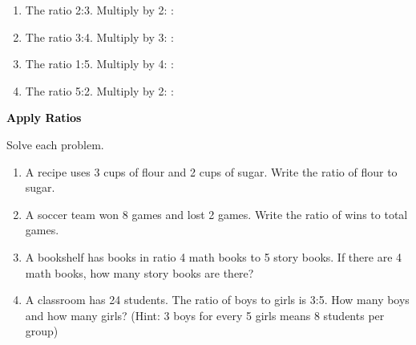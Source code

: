 \documentclass[12pt, letterpaper, fleqn]{article}
\newcommand{\blank}{\underline{\hspace{2.2cm}}}
\begin{document}
\begin{enumerate}[itemsep=1.5cm, leftmargin=0.6cm]

\item The ratio 2:3. Multiply by 2: \blank : \blank

\item The ratio 3:4. Multiply by 3: \blank : \blank

\item The ratio 1:5. Multiply by 4: \blank : \blank

\item The ratio 5:2. Multiply by 2: \blank : \blank

\end{enumerate}

\newpage

\begin{tcolorbox}[colback=customteal!20]
\large\textcolor{black}{\textbf{Apply Ratios}}
\end{tcolorbox}

\noindent
Solve each problem.

\vspace{3mm}

\begin{enumerate}[itemsep=1.8cm, leftmargin=0.6cm]

\item A recipe uses 3 cups of flour and 2 cups of sugar. Write the ratio of flour to sugar.

\vspace{1.2cm}

\item A soccer team won 8 games and lost 2 games. Write the ratio of wins to total games.

\vspace{1.2cm}

\item A bookshelf has books in ratio 4 math books to 5 story books. If there are 4 math books, how many story books are there?

\vspace{1.2cm}

\item A classroom has 24 students. The ratio of boys to girls is 3:5. How many boys and how many girls? (Hint: 3 boys for every 5 girls means 8 students per group)

\vspace{1.5cm}

\end{enumerate}
\end{document}
